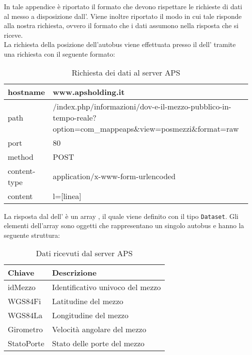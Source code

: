  \label{app:aps}
In tale appendice è riportato il formato che devono rispettare le richieste di dati al  messo a disposizione dall'. Viene inoltre riportato il modo in cui tale  risponde alla nostra richiesta, ovvero il formato che i dati assumono nella risposta che si riceve.\\
La richiesta della posizione dell'autobus viene effettuata presso il  dell' tramite una richiesta  con il seguente formato:

\begin{table}[H]
	\centering
	\begin{tabu}{| X[0.4] | X |}
		\hline
		hostname & www.apsholding.it \\ \hline
		path & /index.php/informazioni/dov-e-il-mezzo-pubblico-in-tempo-reale?option=com\_mappeaps\&view=posmezzi\&format=raw  \\ \hline
		port & 80 \\ \hline		
		method & POST \\ \hline 
		content-type & application/x-www-form-urlencoded \\ \hline
		content & l=[linea] \\ \hline
	\end{tabu}
	\caption{Richiesta dei dati al server APS}
\end{table}

La risposta dal  dell' è un array , il quale viene definito con il tipo \texttt{Dataset}. Gli elementi dell'array sono oggetti che rappresentano un singolo autobus e hanno la seguente struttura:

\begin{table}[H]
	\centering
	\begin{tabu}{| X[0.4] | X |}
		\hline
		\rowfont{\bfseries}
		Chiave & Descrizione \\ \hline
		idMezzo & Identificativo univoco del mezzo \\ \hline
		WGS84Fi & Latitudine del mezzo \\ \hline
		WGS84La & Longitudine del mezzo \\ \hline
		Girometro & Velocità angolare del mezzo \\ \hline
		StatoPorte & Stato delle porte del mezzo \\ \hline
	\end{tabu}
	\caption{Dati ricevuti dal server APS}
\end{table}
